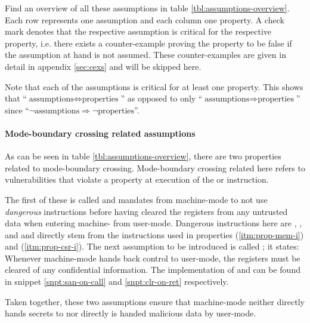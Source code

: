 Find an overview of all these assumptions in table \ref{tbl:assumptions-overview}.
Each row represents one assumption and each column one property.
A check mark denotes that the respective assumption is critical for the respective property, i.e. there exists a counter-example proving the property to be false if the assumption at hand is not assumed.
These counter-examples are given in detail in appendix \ref{sec:cexs} and will be skipped here.

Note that each of the assumptions is critical for at least one property.
This shows that \enquote{$ \text{assumptions} \Leftrightarrow \text{properties} $} as opposed to only \enquote{$ \text{assumptions} \Rightarrow \text{properties} $} since \enquote{$ \neg \text{assumptions} \Rightarrow \neg \text{properties} $}.

\paragraph{Mode-boundary crossing related assumptions}
As can be seen in table \ref{tbl:assumptions-overview}, there are two properties related to mode-boundary crossing.
Mode-boundary crossing related here refers to vulnerabilities that violate a property at execution of the  or  instruction.

The first of these is called  and mandates from machine-mode to not use \textit{dangerous} instructions before having cleared the registers from any untrusted data when entering machine- from user-mode.
Dangerous instructions here are , ,  and  and directly stem from the instructions used in properties  (\ref{itm:prop-mem-i}) and  (\ref{itm:prop-csr-i}).
The next assumption to be introduced is called ; it states: Whenever machine-mode hands back control to user-mode, the registers must be cleared of any confidential information.
The implementation of  and  can be found in snippet \ref{snpt:san-on-call} and \ref{snpt:clr-on-ret} respectively.

Taken together, these two assumptions ensure that machine-mode neither directly hands secrets to nor directly is handed malicious data by user-mode.

